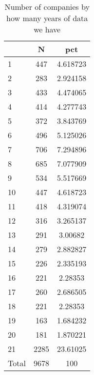 \begin{table}[htbp]\centering
\caption{Number of companies by how many years of data we have}
\begin{tabular}{l*{1}{cc}}
\toprule
                    &           N&         pct\\
\midrule
1                   &         447&    4.618723\\
2                   &         283&    2.924158\\
3                   &         433&    4.474065\\
4                   &         414&    4.277743\\
5                   &         372&    3.843769\\
6                   &         496&    5.125026\\
7                   &         706&    7.294896\\
8                   &         685&    7.077909\\
9                   &         534&    5.517669\\
10                  &         447&    4.618723\\
11                  &         418&    4.319074\\
12                  &         316&    3.265137\\
13                  &         291&     3.00682\\
14                  &         279&    2.882827\\
15                  &         226&    2.335193\\
16                  &         221&     2.28353\\
17                  &         260&    2.686505\\
18                  &         221&     2.28353\\
19                  &         163&    1.684232\\
20                  &         181&    1.870221\\
21                  &        2285&    23.61025\\
Total               &        9678&         100\\
\bottomrule
\end{tabular}
\end{table}
